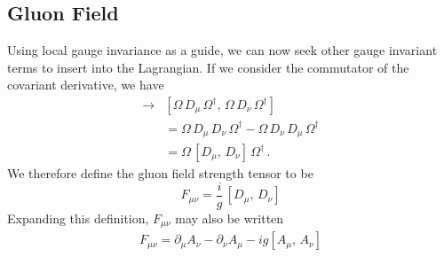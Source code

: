 \subsection{Gluon Field}
Using local gauge invariance as a guide, we can now seek other gauge invariant terms to insert into the Lagrangian. If we consider the commutator of the covariant derivative, we have
%
\begin{align*}
[D_\mu,\, D_\nu]\rightarrow &[\Omega\,D_\mu\,\Omega^\dag,\,\Omega\,D_\nu\,\Omega^\dag]\\
&= \Omega\,D_\mu\, D_\nu\,\Omega^\dag - \Omega\,D_\nu\, D_\mu\,\Omega^\dag\\
&= \Omega\,[D_\mu,\,D_\nu]\,\Omega^\dag\, .
\end{align*}
%
We therefore define the gluon field strength tensor to be
%
\begin{equation}
F_{\mu\nu} = \frac{i}{g}\,[D_\mu,\, D_\nu]
\end{equation}
%
Expanding this definition, $F_{\mu\nu}$ may also be written
%
\begin{align}
F_{\mu\nu}=\partial_\mu A_\nu - \partial_\nu A_\mu - ig[A_\mu,\,A_\nu]
\end{align}
%
